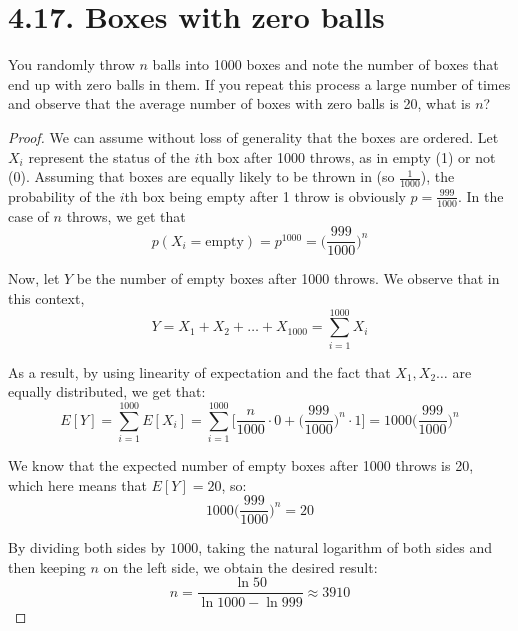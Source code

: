 \section*{4.17. Boxes with zero balls}
You randomly throw $n$ balls into 1000 boxes and note the number of boxes
that end up with zero balls in them. If you repeat this process a large number
of times and observe that the average number of boxes with zero balls is 20,
what is $n$? 

\vspace{1em}

\begin{proof}
    We can assume without loss of generality that the boxes are ordered.
    Let $X_i$ represent the status of the $i$th box after 1000 throws, as
    in empty (1) or not (0). Assuming that boxes are equally likely to be thrown in
    (so $\frac{1}{1000}$), the probability of the $i$th box being empty after 1 throw 
    is obviously $p = \frac{999}{1000}$. In the case of $n$ throws, we get that
    \[
        p(X_i = \text{empty}) = p^{1000} = \bigg(\frac{999}{1000}\bigg)^n
    \] 

    Now, let $Y$ be the number of empty boxes after 1000 throws. We observe that
    in this context,
    \[
        Y = X_1 + X_2 + \ldots + X_{1000} = \sum_{i = 1}^{1000} X_i
    \] 

    As a result, by using linearity of expectation and the fact that $X_1, X_2 \ldots$
    are equally distributed, we get that:
    \[
        E[Y] = \sum_{i = 1}^{1000} E[X_i] = 
        \sum_{i = 1}^{1000} \bigg[\frac{n}{1000} \cdot 0 + \bigg(\frac{999}{1000}\bigg)^n \cdot 1\bigg]
        = 1000 \bigg(\frac{999}{1000}\bigg)^n
    \] 

    We know that the expected number of empty boxes after 1000 throws is 20,
    which here means that $E[Y] = 20$, so:
    \[
        1000\bigg(\frac{999}{1000}\bigg)^n = 20
    \] 

    By dividing both sides by $1000$, taking the natural logarithm of
    both sides and then keeping $n$ on the left side, we obtain the 
    desired result:
     \[
         n = \frac{\ln 50}{\ln 1000 - \ln 999} \approx 3910
    \] 
\end{proof}

